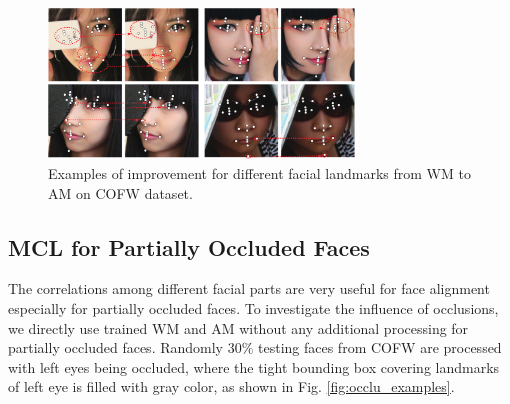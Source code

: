 \documentclass[journal]{IEEEtran}
\begin{document}
\begin{figure}[!htb]
  \centering
  \includegraphics[width=3.2in]{validate_combine_examples}
  \caption{Examples of improvement for different facial landmarks from WM to AM on COFW dataset.}
  \label{fig:combine_validate_examples} %
\end{figure}

\subsection{MCL for Partially Occluded Faces}

The correlations among different facial parts are very useful for face alignment especially for partially occluded faces. To investigate the influence of occlusions, we directly use trained WM and AM without any additional processing for partially occluded faces. Randomly $30\%$ testing faces from COFW are processed with left eyes being occluded, where the tight bounding box covering landmarks of left eye is filled with gray color, as shown in Fig. \ref{fig:occlu_examples}.
\end{document}
